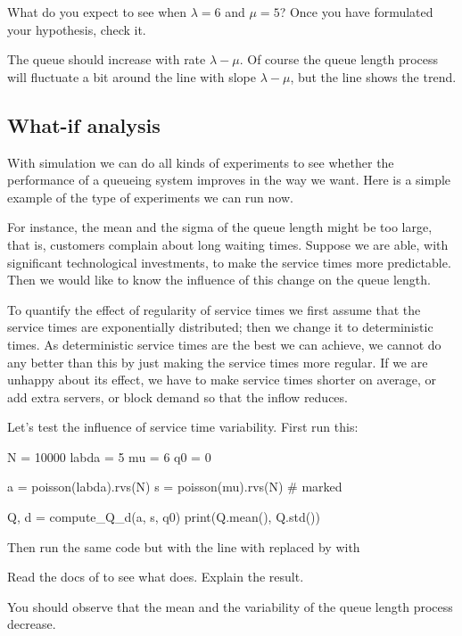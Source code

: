 \begin{exercise}
What do you expect to see when $\lambda=6$ and $\mu=5$? Once you have formulated your hypothesis, check it.
\begin{solution}
  The queue should increase with rate $\lambda - \mu$. Of course the queue length process will fluctuate a bit around the line with slope $\lambda-\mu$, but the line shows the trend. 
\end{solution}
\end{exercise}

\subsection{What-if analysis}
\label{sec:what-if-analysis}

With simulation we can do all kinds of experiments to see whether the performance of a queueing system improves in the way we want. Here is a simple example of the type of experiments we can run now. 

For instance,  the mean and the sigma of the queue length  might be too large, that is, customers complain about long waiting times.  Suppose we are able, with significant technological investments, to make the service times more predictable. Then we would like to know  the influence of this change on the queue length.

To quantify the effect of regularity of service times we first assume that the service times are exponentially distributed; then we change it to deterministic times.
As deterministic service times are the best we can achieve,  we cannot do any better than this by just making the service times more regular. If we are unhappy about its effect, we have to make service times shorter on average, or add extra servers, or block demand so that the inflow reduces. 

\begin{exercise}
Let's test the influence of service time variability. First run this:
\begin{pyverbatim}
N = 10000
labda = 5
mu = 6
q0 = 0

a = poisson(labda).rvs(N)
s = poisson(mu).rvs(N)  # marked

Q, d = compute_Q_d(a, s, q0)
print(Q.mean(), Q.std())
\end{pyverbatim}
Then run the same code but with the line with  replaced by with
\begin{pyverbatim}
\end{pyverbatim}
Read the docs of  to see what  does.  Explain the result.
\begin{solution}
	You should observe that the mean and the variability of the queue length process decrease.
\end{solution}
\end{exercise}




